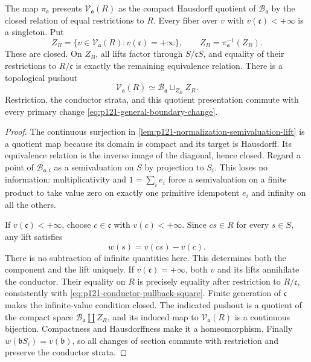 \begin{theorem}\label{thm:p121-excellent-conductor-descent}
The map $\pi_{\mathfrak a}$ presents $\mathcal V_{\mathfrak a}(R)$
as the compact Hausdorff quotient of $\mathcal B_{\mathfrak a}$ by
the closed relation of equal restrictions to $R$.
Every fiber over $v$ with $v(\mathfrak c)<+\infty$ is a singleton.
Put
\[
 Z_R=\{v\in\mathcal V_{\mathfrak a}(R):v(\mathfrak c)=+\infty\},
 \qquad Z_B=\pi_{\mathfrak a}^{-1}(Z_R).
\]
These are closed. On $Z_B$, all lifts factor through $S/\mathfrak cS$,
and equality of their restrictions to $R/\mathfrak c$ is exactly the
remaining equivalence relation. There is a topological pushout
\[
              \mathcal V_{\mathfrak a}(R)
                  \simeq\mathcal B_{\mathfrak a}\sqcup_{Z_B}Z_R.
\]
Restriction, the conductor strata, and this quotient presentation commute
with every primary change \eqref{eq:p121-general-boundary-change}.
\end{theorem}

\begin{proof}
The continuous surjection in
\cref{lem:p121-normalization-semivaluation-lift} is a quotient map
because its domain is compact and its target is Hausdorff.
Its equivalence relation is the inverse image of the diagonal, hence closed.
Regard a point of $\mathcal B_{\mathfrak a,i}$ as a semivaluation on
$S$ by projection to $S_i$. This loses no information: multiplicativity
and $1=\sum_ie_i$ force a semivaluation on a finite product to take
value zero on exactly one primitive idempotent $e_i$ and infinity on
all the others.

If $v(\mathfrak c)<+\infty$, choose $c\in\mathfrak c$ with
$v(c)<+\infty$. Since $cs\in R$ for every $s\in S$, any lift satisfies
\[
                         w(s)=v(cs)-v(c).
\]
There is no subtraction of infinite quantities here. This determines
both the component and the lift uniquely. If $v(\mathfrak c)=+\infty$,
both $v$ and its lifts annihilate the conductor. Their equality on $R$
is precisely equality after restriction to $R/\mathfrak c$, consistently
with \eqref{eq:p121-conductor-pullback-square}. Finite generation of
$\mathfrak c$ makes the infinite-value condition closed. The indicated
pushout is a quotient of the compact space
$\mathcal B_{\mathfrak a}\coprod Z_R$, and its induced map to
$\mathcal V_{\mathfrak a}(R)$ is a continuous bijection. Compactness
and Hausdorffness make it a homeomorphism.
Finally $w(\mathfrak bS_i)=v(\mathfrak b)$, so all changes of section
commute with restriction and preserve the conductor strata.
\end{proof}

